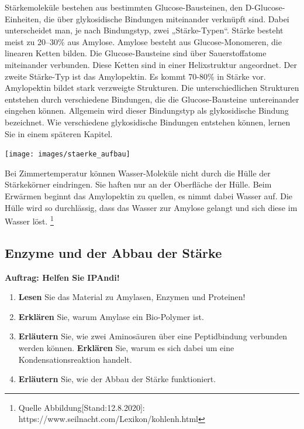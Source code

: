 \documentclass{scrartcl}  %
\begin{document}
\begin{tcolorbox}
				Stärkemoleküle bestehen aus bestimmten Glucose-Bausteinen, den D-Glucose-Einheiten, die über glykosidische Bindungen miteinander verknüpft sind. Dabei unterscheidet man, je nach Bindungstyp, zwei „Stärke-Typen“. 
				Stärke besteht meist zu 20–30\% aus Amylose. Amylose besteht aus Glucose-Monomeren, die linearen Ketten bilden. Die Glucose-Bausteine sind über Sauerstoffatome miteinander verbunden. Diese Ketten sind in einer Helixstruktur angeordnet. 
				Der zweite Stärke-Typ ist das Amylopektin. Es kommt 70-80\% in Stärke vor. Amylopektin bildet stark verzweigte Strukturen. 
				Die unterschiedlichen Strukturen entstehen durch verschiedene Bindungen, die die Glucose-Bausteine untereinander eingehen können. Allgemein wird dieser Bindungstyp als glykosidische Bindung bezeichnet. Wie verschiedene glykosidische Bindungen entstehen können, lernen Sie in einem späteren Kapitel.
				\begin{center}
					\texttt{[image: images/staerke\_aufbau]}
				\end{center}
				Bei Zimmertemperatur können Wasser-Moleküle nicht durch die Hülle der Stärkekörner eindringen. Sie haften nur an der Oberfläche der Hülle. Beim Erwärmen beginnt das Amylopektin zu quellen, es nimmt dabei Wasser auf. Die Hülle wird so durchlässig, dass das Wasser zur Amylose gelangt und sich diese im Wasser löst.
				\footnote{Quelle Abbildung[Stand:12.8.2020]: https://www.seilnacht.com/Lexikon/kohlenh.html}
			\end{tcolorbox}
		
		\subsection{Enzyme und der Abbau der Stärke}
		
			\textbf{Auftrag: Helfen Sie IPAndi!}
			\begin{enumerate}
				\item \textbf{Lesen} Sie das Material zu Amylasen, Enzymen und Proteinen!
			    \item \textbf{Erklären} Sie, warum Amylase ein Bio-Polymer ist.
			    \item \textbf{Erläutern} Sie, wie zwei Aminosäuren über eine Peptidbindung verbunden werden können. \textbf{Erklären} Sie, warum es sich dabei um eine Kondensationsreaktion handelt.
			    \item \textbf{Erläutern} Sie, wie der Abbau der Stärke funktioniert.
			\end{enumerate}
			
\end{document}
